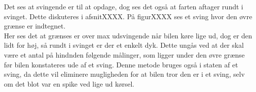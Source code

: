Det ses at svingende er til at opdage, dog ses det også at farten aftager rundt i svinget. Dette diskuteres i afsnitXXXX. På figurXXXX ses et sving hvor den øvre grænse er indtegnet.\\

Her ses det at grænses er over max udsvingende når bilen køre lige ud, dog er den lidt for høj, så rundt i svinget er der et enkelt dyk. Dette ungås ved at der skal være et antal på hindnden følgende målinger, som ligger under den øvre grænse før bilen konstateres ude af et sving. Denne metode bruges også i staten af et sving, da dette vil  eliminere mugligheden for at bilen tror den er i et sving, selv om det blot var en spike ved lige ud kørsel.\\



